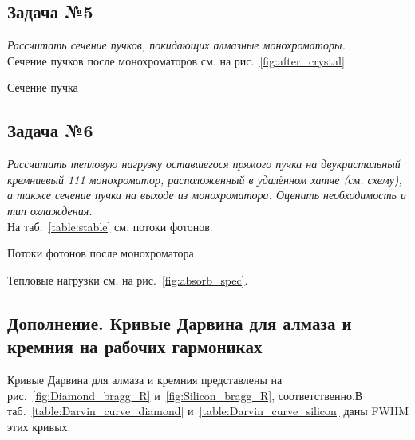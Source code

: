 \documentclass[14pt,a4paper]{extarticle}
\numberwithin{equation}{section}
\begin{document}
	\subsection{Задача №5}
	\textit{Рассчитать сечение пучков, покидающих алмазные монохроматоры.}\\
	Сечение пучков после монохроматоров см. на рис.~\ref{fig:after_crystal}
	\begin{table}[h!]
		\renewcommand*\dtlrealalign{S}
		\caption{Сечение пучка}
		\centering
	\end{table}
	
	\subsection{Задача №6}
	\textit{Рассчитать тепловую нагрузку оставшегося прямого пучка на двукристальный кремниевый 111 монохроматор, расположенный в удалённом хатче (см. схему), а также сечение пучка на выходе из монохроматора. Оценить необходимость и тип охлаждения.}\\
	На таб.~\ref{table:stable} см. потоки фотонов.
	\begin{table}[h!]
		\renewcommand*\dtlrealalign{S}
		\caption{Потоки фотонов после монохроматора}
		\centering
		\label{table:stable}
	\end{table}
	
	Тепловые нагрузки см. на рис.~\ref{fig:absorb_spec}.
	
	\subsection{Дополнение. Кривые Дарвина для алмаза и кремния на рабочих гармониках}
	Кривые Дарвина для алмаза и кремния представлены на рис.~\ref{fig:Diamond_bragg_R} и~\ref{fig:Silicon_bragg_R}, соответственно.В таб.~\ref{table:Darvin_curve_diamond} и~\ref{table:Darvin_curve_silicon} даны FWHM этих кривых. 
	
\end{document}
